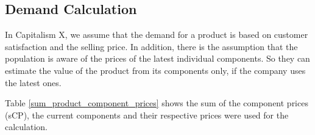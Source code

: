 \subsection{Demand Calculation}



\label{demandCalc}
In Capitalism X, we assume that the demand for a product is based on customer satisfaction and the selling price. In addition, there is the assumption that the population is aware of the prices of the latest individual components. So they can estimate the value of the product from its components only, if the company uses the latest ones.
 
Table \ref{sum_product_component_prices} shows the sum of the component prices (\gls{sCP}), the current components and their respective prices were used for the calculation.


